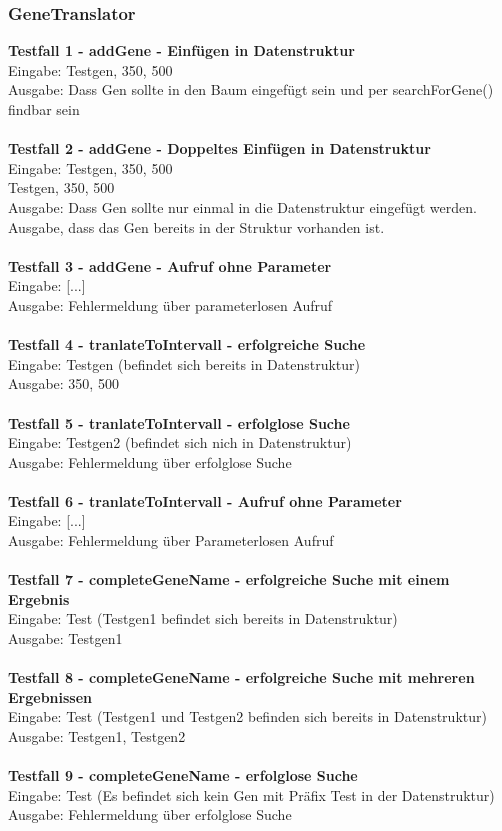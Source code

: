 \subsubsection{GeneTranslator}
\textbf{Testfall 1 - addGene - Einfügen in Datenstruktur}\\
Eingabe: Testgen, 350, 500\\
Ausgabe: Dass Gen sollte in den Baum eingefügt sein und per searchForGene() findbar sein\\
\\
\textbf{Testfall 2 - addGene - Doppeltes Einfügen in Datenstruktur}\\
Eingabe: Testgen, 350, 500\\
		 Testgen, 350, 500\\
Ausgabe: Dass Gen sollte nur einmal in die Datenstruktur eingefügt werden. Ausgabe, dass das Gen bereits in der Struktur vorhanden ist.\\
\\
\textbf{Testfall 3 - addGene - Aufruf ohne Parameter}\\
Eingabe: [...]\\
Ausgabe: Fehlermeldung über  parameterlosen Aufruf\\
\\
\textbf{Testfall 4 - tranlateToIntervall - erfolgreiche Suche}\\
Eingabe: Testgen (befindet sich bereits in Datenstruktur)\\
Ausgabe: 350, 500\\
\\
\textbf{Testfall 5 - tranlateToIntervall - erfolglose Suche}\\
Eingabe: Testgen2 (befindet sich nich in Datenstruktur)\\
Ausgabe: Fehlermeldung über erfolglose Suche\\
\\
\textbf{Testfall 6 - tranlateToIntervall - Aufruf ohne Parameter}\\
Eingabe: [...]\\
Ausgabe: Fehlermeldung über Parameterlosen Aufruf\\
\\
\textbf{Testfall 7 - completeGeneName - erfolgreiche Suche mit einem Ergebnis}\\
Eingabe: Test (Testgen1 befindet sich bereits in Datenstruktur)\\
Ausgabe: Testgen1\\
\\
\textbf{Testfall 8 - completeGeneName - erfolgreiche Suche mit mehreren Ergebnissen}\\
Eingabe: Test (Testgen1 und Testgen2 befinden sich bereits in Datenstruktur)\\
Ausgabe: Testgen1, Testgen2\\
\\
\textbf{Testfall 9 - completeGeneName - erfolglose Suche}\\
Eingabe: Test (Es befindet sich kein Gen mit Präfix Test in der Datenstruktur)\\
Ausgabe: Fehlermeldung über erfolglose Suche
